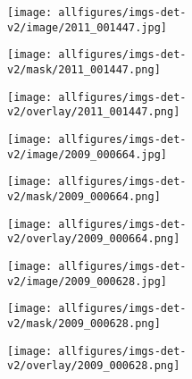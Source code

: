 \documentclass{article} \usepackage{iclr2022_conference,times}
\begin{document}
\begin{figure}[ht]
\centering
\begin{subfigure}{.33\textwidth}
  \centering
  \texttt{[image: allfigures/imgs-det-v2/image/2011\_001447.jpg]}
\end{subfigure}\hfil
\begin{subfigure}{.33\textwidth}
  \centering
  \texttt{[image: allfigures/imgs-det-v2/mask/2011\_001447.png]}
\end{subfigure}\hfil
\begin{subfigure}{.33\textwidth}
  \centering
  \texttt{[image: allfigures/imgs-det-v2/overlay/2011\_001447.png]}
\end{subfigure}\hfil

\vspace{0.5cm}

\begin{subfigure}{.33\textwidth}
  \centering
  \texttt{[image: allfigures/imgs-det-v2/image/2009\_000664.jpg]}
\end{subfigure}\hfil
\begin{subfigure}{.33\textwidth}
  \centering
  \texttt{[image: allfigures/imgs-det-v2/mask/2009\_000664.png]}
\end{subfigure}\hfil
\begin{subfigure}{.33\textwidth}
  \centering
  \texttt{[image: allfigures/imgs-det-v2/overlay/2009\_000664.png]}
\end{subfigure}\hfil

\vspace{0.5cm}

\begin{subfigure}{.33\textwidth}
  \centering
  \texttt{[image: allfigures/imgs-det-v2/image/2009\_000628.jpg]}
\end{subfigure}\hfil
\begin{subfigure}{.33\textwidth}
  \centering
  \texttt{[image: allfigures/imgs-det-v2/mask/2009\_000628.png]}
\end{subfigure}\hfil
\begin{subfigure}{.33\textwidth}
  \centering
  \texttt{[image: allfigures/imgs-det-v2/overlay/2009\_000628.png]}
\end{subfigure}\hfil

\vspace{0.5cm}


\end{figure}
\end{document}
